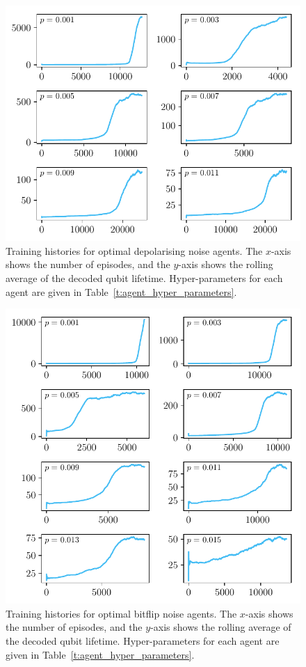 \documentclass[twocolumn,preprintnumbers,amsmath,amssymb,notitlepage,nofootinbib,longbibliography,superscriptaddress,aps,pra,10pt]{revtex4-1}
\begin{document}
	\begin{figure}
		\centering
		\includegraphics[width=\linewidth]{figures/depolarising_histories.pdf}
		\caption{
			Training histories for optimal depolarising noise agents.
			The $x$-axis shows the number of episodes, and the $y$-axis shows the rolling average of the decoded qubit lifetime.
			Hyper-parameters for each agent are given in Table~\ref{t:agent_hyper_parameters}.
		}
		\label{f:training_results_dp}
	\end{figure}

	\begin{figure}
		\centering{}
		\includegraphics[width=\linewidth]{figures/bitflip_histories.pdf}
		\caption{
			Training histories for optimal bitflip noise agents.
			The $x$-axis shows the number of episodes, and the $y$-axis shows the rolling average of the decoded qubit lifetime.
			Hyper-parameters for each agent are given in Table~\ref{t:agent_hyper_parameters}.
		}
		\label{f:training_results_x}
	\end{figure}

\clearpage


\end{document}
